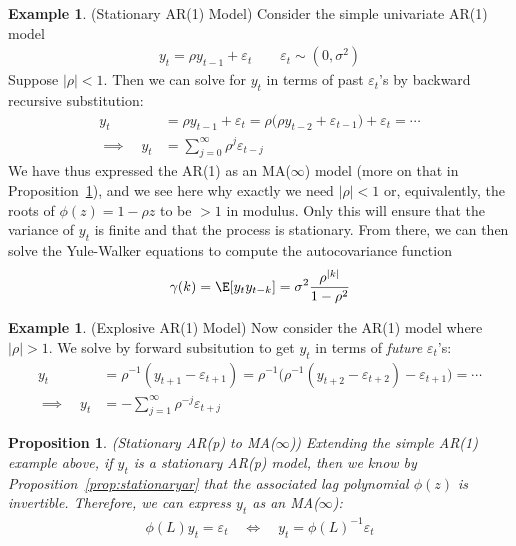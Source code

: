 \documentclass[12pt]{article}
\theoremstyle{plain}
\newtheorem{prop}[thm]{Proposition}
\theoremstyle{definition}
\newtheorem{ex}[thm]{Example}
\theoremstyle{remark}
\begin{document}
\begin{ex}(Stationary AR(1) Model)
Consider the simple univariate AR(1) model
\begin{align*}
  y_t = \rho y_{t-1} + \varepsilon_t
  \qquad \varepsilon_t\sim(0,\sigma^2)
\end{align*}
Suppose $|\rho|<1$. Then we can solve for $y_t$ in terms of past
$\varepsilon_t$'s by backward recursive substitution:
\begin{align*}
  y_t
  &= \rho y_{t-1} + \varepsilon_t
  = \rho\big(\rho y_{t-2} + \varepsilon_{t-1}\big) + \varepsilon_t
  = \cdots \\
  \implies\quad
  y_t
  &=
  \sum_{j=0}^\infty \rho^j\varepsilon_{t-j}
\end{align*}
We have thus expressed the AR(1) as an MA($\infty$) model (more on that
in Proposition~\ref{prop:artoma}), and we see here why exactly we need
$|\rho|<1$ or, equivalently, the roots of $\phi(z) = 1-\rho z$ to be
$>1$ in modulus. Only this will ensure that the variance of $y_t$ is
finite and that the process is stationary.  From there, we can then
solve the Yule-Walker equations to compute the autocovariance function
\begin{align*}
  \gamma(k) = \E[y_ty_{t-k}] = \sigma^2 \frac{\rho^{|k|}}{1-\rho^2}
\end{align*}
\end{ex}

\begin{ex}(Explosive AR(1) Model)
Now consider the AR(1) model where $|\rho|>1$. We solve by forward
subsitution to get $y_t$ in terms of \emph{future} $\varepsilon_t$'s:
\begin{align*}
  y_t
  &= \rho^{-1}(y_{t+1} - \varepsilon_{t+1})
  = \rho^{-1}\big(
      \rho^{-1}(y_{t+2} - \varepsilon_{t+2}) - \varepsilon_{t+1}\big)
  = \cdots \\
  \implies\quad
  y_t
  &=
  -\sum_{j=1}^\infty \rho^{-j}\varepsilon_{t+j}
\end{align*}
\end{ex}

\begin{prop}\emph{(Stationary AR(p) to MA($\infty$))}
\label{prop:artoma}
Extending the simple AR(1) example above, if $y_t$ is a stationary AR(p)
model, then we know by Proposition~\ref{prop:stationaryar} that the
associated lag polynomial $\phi(z)$ is invertible. Therefore, we can
express $y_t$ as an MA($\infty$):
\begin{align*}
  \phi(L)y_t = \varepsilon_t
  \quad\iff\quad
  y_t = \phi(L)^{-1}\varepsilon_t
\end{align*}
\end{prop}
\end{document}
